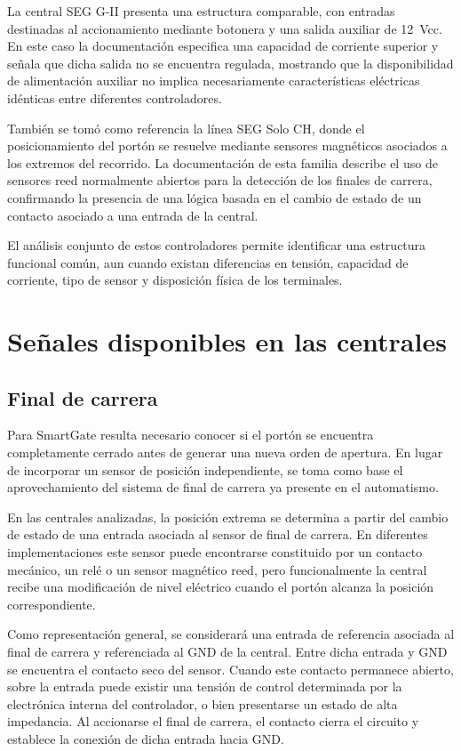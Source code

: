 La central SEG G-II presenta una estructura comparable, con entradas destinadas al accionamiento mediante botonera y una salida auxiliar de 12~Vcc. En este caso la documentación especifica una capacidad de corriente superior y señala que dicha salida no se encuentra regulada, mostrando que la disponibilidad de alimentación auxiliar no implica necesariamente características eléctricas idénticas entre diferentes controladores.

También se tomó como referencia la línea SEG Solo CH, donde el posicionamiento del portón se resuelve mediante sensores magnéticos asociados a los extremos del recorrido. La documentación de esta familia describe el uso de sensores reed normalmente abiertos para la detección de los finales de carrera, confirmando la presencia de una lógica basada en el cambio de estado de un contacto asociado a una entrada de la central.

El análisis conjunto de estos controladores permite identificar una estructura funcional común, aun cuando existan diferencias en tensión, capacidad de corriente, tipo de sensor y disposición física de los terminales.

\section{Señales disponibles en las centrales}

\subsection{Final de carrera}

Para SmartGate resulta necesario conocer si el portón se encuentra completamente cerrado antes de generar una nueva orden de apertura. En lugar de incorporar un sensor de posición independiente, se toma como base el aprovechamiento del sistema de final de carrera ya presente en el automatismo.

En las centrales analizadas, la posición extrema se determina a partir del cambio de estado de una entrada asociada al sensor de final de carrera. En diferentes implementaciones este sensor puede encontrarse constituido por un contacto mecánico, un relé o un sensor magnético reed, pero funcionalmente la central recibe una modificación de nivel eléctrico cuando el portón alcanza la posición correspondiente.

Como representación general, se considerará una entrada de referencia asociada al final de carrera y referenciada al GND de la central. Entre dicha entrada y GND se encuentra el contacto seco del sensor. Cuando este contacto permanece abierto, sobre la entrada puede existir una tensión de control determinada por la electrónica interna del controlador, o bien presentarse un estado de alta impedancia. Al accionarse el final de carrera, el contacto cierra el circuito y establece la conexión de dicha entrada hacia GND.

